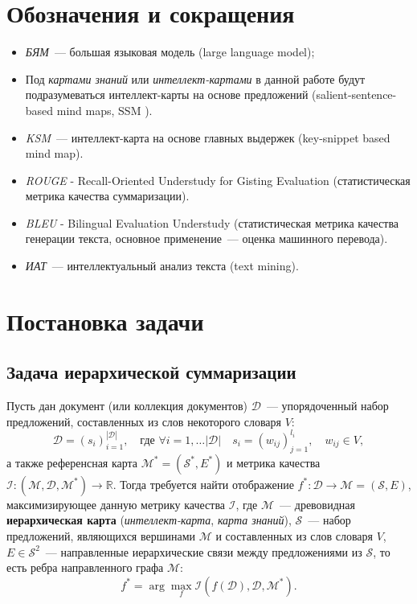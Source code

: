 \documentclass[12pt]{article}
\newcommand{\D}{\mathcal{D}}
\newcommand{\M}{\mathcal{M}}
\newcommand{\I}{\mathcal{I}}
\renewcommand{\S}{\mathcal{S}}
\newcommand{\R}{\mathbb{R}}
\begin{document}
\section*{Обозначения и сокращения}
\begin{itemize}
    \item \textit{БЯМ}~--- большая языковая модель (large language model);
    
    \item Под \textit{картами знаний} или \textit{интеллект-картами} в данной работе будут подразумеваться интеллект-карты на основе предложений (salient-sentence-based mind maps, SSM \cite{wei2019revealing}).

    \item \textit{KSM}~--- интеллект-карта на основе главных выдержек (key-snippet based mind map).

    \item \textit{ROUGE} - Recall-Oriented Understudy for Gisting Evaluation (статистическая метрика качества суммаризации).

    \item \textit{BLEU} - Bilingual Evaluation Understudy (статистическая метрика качества генерации текста, основное применение~--- оценка машинного перевода).

    \item \textit{ИАТ}~--- интеллектуальный анализ текста (text mining).
\end{itemize}

\newpage
\section{Постановка задачи}
\subsection{Задача иерархической суммаризации}
Пусть дан документ (или коллекция документов) $\D$~--- упорядоченный набор предложений, составленных из слов некоторого словаря $V$: 
$$
\D = \left(s_i\right)_{i=1}^{|\D|},\quad \text{где } \forall i=1,\dots |\D|\quad s_i = \left(w_{ij}\right)_{j=1}^{l_i}, \quad w_{ij}\in V,
$$
а также референсная карта $\M^* = (\S^*, E^*)$ и метрика качества $\I: (\M, \D, \M^*) \rightarrow \R$. Тогда требуется найти отображение $f^*: \D \rightarrow \M = (\S, E)$, максимизирующее данную метрику качества $\I$, где $\M$~--- древовидная \textbf{иерархическая карта} (\textit{интеллект-карта}, \textit{карта знаний}), $\S$~--- набор предложений, являющихся вершинами $\M$ и составленных из слов словаря $V$, $E\in \S^2$~--- направленные иерархические связи между предложениями из $\S$, то есть ребра направленного графа $\M$:
$$
f^* = \arg\max\limits_{f} \I(f(\D), \D, \M^*).
$$
\end{document}
